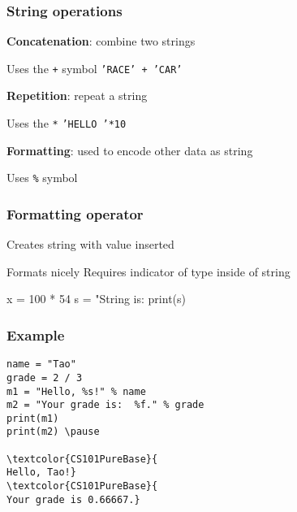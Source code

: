 \documentclass[11pt]{beamer}
\begin{document}
\begin{frame}
  \frametitle{String operations}
  \Enlarge

  \begin{itemize}
  \myitem  \textbf{Concatenation}:  combine two strings
    \begin{itemize}
    \mysubitem  Uses the \texttt{+} symbol
    \mysubitem  \texttt{'RACE' + 'CAR'}
    \end{itemize} \pause
  \myitem  \textbf{Repetition}:  repeat a string
    \begin{itemize}
    \mysubitem  Uses the \texttt{*}
    \mysubitem  \texttt{'HELLO '*10}
    \end{itemize} \pause
  \myitem  \textbf{Formatting}:  used to encode other data as string
    \begin{itemize}
    \mysubitem  Uses \texttt{\%} symbol
    \end{itemize}
  \end{itemize}
\end{frame}

\begin{frame}[fragile]
  \frametitle{Formatting operator}
  \Enlarge

  \begin{itemize}
  \myitem  Creates string with value inserted \pause
    \begin{itemize}
    \mysubitem  Formats nicely
    \mysubitem  Requires indicator of type inside of string
    \end{itemize} \pause
  \begin{semiverbatim}
x = 100 * 54
s = "String is: %
print(s)
  \end{semiverbatim}
  \end{itemize}
\end{frame}

\begin{frame}[fragile]
  \frametitle{Example}
  \Enlarge

  \begin{Verbatim}[commandchars=\\\{\}]
name = "Tao"
grade = 2 / 3
m1 = "Hello, %s!" % name
m2 = "Your grade is:  %f." % grade
print(m1)
print(m2) \pause

\textcolor{CS101PureBase}{
Hello, Tao!}
\textcolor{CS101PureBase}{
Your grade is 0.66667.}
  \end{Verbatim}
\end{frame}
\end{document}
